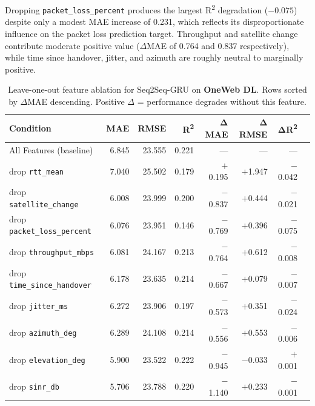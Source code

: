 \documentclass[12pt]{article}
\begin{document}
Dropping \texttt{packet\_loss\_percent} produces the largest R\textsuperscript{2} degradation ($-0.075$) despite only a modest MAE increase of 0.231, which reflects its disproportionate influence on the packet loss prediction target. Throughput and satellite change contribute moderate positive value ($\Delta$MAE of 0.764 and 0.837 respectively), while time since handover, jitter, and azimuth are roughly neutral to marginally positive.

\begin{table}[ht]
\centering
\caption{Leave-one-out feature ablation for Seq2Seq-GRU on \textbf{OneWeb DL}.
Rows sorted by $\Delta$MAE descending. Positive $\Delta$ = performance degrades without this feature.}
\label{tab:ablation_oneweb}
\setlength{\tabcolsep}{5pt}
\renewcommand{\arraystretch}{1.12}
\small
\begin{tabular}{lrrrrrrr}
\toprule
\textbf{Condition} & \textbf{MAE} & \textbf{RMSE} & \textbf{R\textsuperscript{2}}
  & $\boldsymbol{\Delta}$\textbf{MAE} & $\boldsymbol{\Delta}$\textbf{RMSE} & $\boldsymbol{\Delta}$\textbf{R\textsuperscript{2}} \\
\midrule
All Features (baseline) & 6.845 & 23.555 & 0.221 & --- & --- & --- \\
\midrule
drop \texttt{rtt\_mean}            & 7.040 & 25.502 & 0.179 & $+$0.195 & $+$1.947 & $-$0.042 \\
drop \texttt{satellite\_change}    & 6.008 & 23.999 & 0.200 & $-$0.837 & $+$0.444 & $-$0.021 \\
drop \texttt{packet\_loss\_percent}& 6.076 & 23.951 & 0.146 & $-$0.769 & $+$0.396 & $-$0.075 \\
drop \texttt{throughput\_mbps}     & 6.081 & 24.167 & 0.213 & $-$0.764 & $+$0.612 & $-$0.008 \\
drop \texttt{time\_since\_handover}& 6.178 & 23.635 & 0.214 & $-$0.667 & $+$0.079 & $-$0.007 \\
drop \texttt{jitter\_ms}           & 6.272 & 23.906 & 0.197 & $-$0.573 & $+$0.351 & $-$0.024 \\
drop \texttt{azimuth\_deg}         & 6.289 & 24.108 & 0.214 & $-$0.556 & $+$0.553 & $-$0.006 \\
drop \texttt{elevation\_deg}       & 5.900 & 23.522 & 0.222 & $-$0.945 & $-$0.033 & $+$0.001 \\
drop \texttt{sinr\_db}             & 5.706 & 23.788 & 0.220 & $-$1.140 & $+$0.233 & $-$0.001 \\
\bottomrule
\end{tabular}
\end{table}
\end{document}

